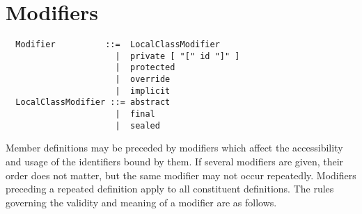 \section{Modifiers}
\label{sec:modifiers}

\syntax\begin{lstlisting}
  Modifier          ::=  LocalClassModifier
                      |  private [ "[" id "]" ] 
                      |  protected
                      |  override
                      |  implicit
  LocalClassModifier ::= abstract
                      |  final
                      |  sealed
\end{lstlisting}

Member definitions may be preceded by modifiers which affect the
accessibility and usage of the identifiers bound by them.  If several
modifiers are given, their order does not matter, but the same
modifier may not occur repeatedly.  Modifiers preceding a repeated
definition apply to all constituent definitions.  The rules governing
the validity and meaning of a modifier are as follows.

